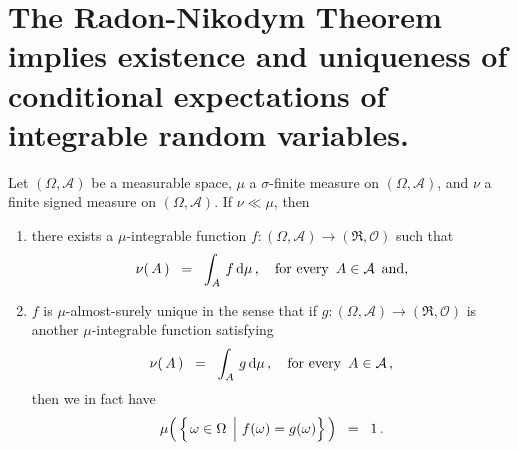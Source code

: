 

\section{The Radon-Nikodym Theorem implies existence and uniqueness of conditional expectations of integrable random variables.}
\setcounter{theorem}{0}
\setcounter{equation}{0}

\renewcommand{\theenumi}{\roman{enumi}}
\renewcommand{\labelenumi}{\textnormal{(\theenumi)}$\;\;$}


\begin{theorem}
\label{Thm:RadonNikodym}
\mbox{}
\vskip 0.2cm
\noindent
Let $(\Omega,\mathcal{A})$ be a measurable space,
$\mu$ a $\sigma$-finite measure on $(\Omega,\mathcal{A})$,
and $\nu$ a finite signed measure on $(\Omega,\mathcal{A})$.
If $\nu \ll \mu$, then
\begin{enumerate}
\item
	there exists a $\mu$-integrable function
	$f : (\Omega,\mathcal{A}) \longrightarrow (\Re,\mathcal{O})$
	such that
	\begin{equation*}
	\nu(\,A\,)
	\;\; = \;\;
		\int_{A}\, f \,\textnormal{d}\mu\,,
	\quad
	\textnormal{for every \,$A\in\mathcal{A}$\, and},
	\end{equation*}
\item
	$f$ is $\mu$-almost-surely unique in the sense that if
	$g : (\Omega,\mathcal{A}) \longrightarrow (\Re,\mathcal{O})$
	is another $\mu$-integrable function satisfying
	\begin{equation*}
	\nu(\,A\,)
	\;\; = \;\;
		\int_{A}\, g \,\textnormal{d}\mu\,,
	\quad
	\textnormal{for every \,$A\in\mathcal{A}$}\,,
	\end{equation*}
	then we in fact have
	\begin{equation*}
	\mu\!\left(\,\left\{\left.\omega\overset{{\color{white}.}}{\in}\Omega\;\,\right\vert\,f(\omega) = g(\omega)\right\}\,\right) \;\;=\;\; 1\,.
	\end{equation*}
\end{enumerate}
\end{theorem}

